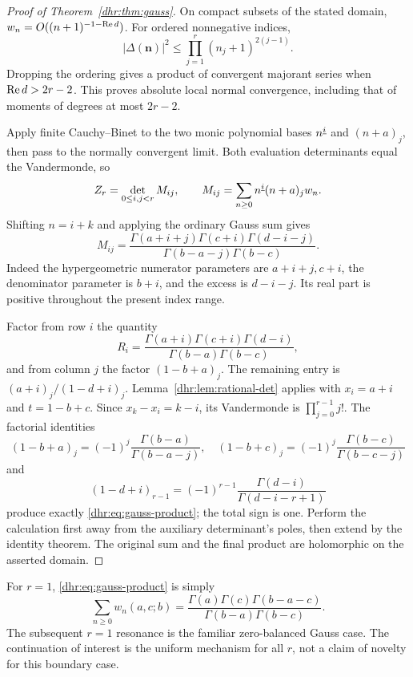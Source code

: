 \begin{proof}[Proof of Theorem~\ref{dhr:thm:gauss}]
On compact subsets of the stated domain,
$w_n=O((n+1)^{-1-\operatorname{Re} d})$. For ordered nonnegative indices,
\[
 |\Delta(\bm n)|^2\leq\prod_{j=1}^r(n_j+1)^{2(j-1)}.
\]
Dropping the ordering gives a product of convergent majorant series
when $\operatorname{Re} d>2r-2$. This proves absolute local normal convergence,
including that of moments of degrees at most $2r-2$.

Apply finite Cauchy--Binet to the two monic polynomial bases
$n^{\underline{i}}$ and $(n+a)_j$, then pass to the normally convergent
limit. Both evaluation determinants equal the Vandermonde, so
\begin{equation}\label{dhr:eq:moment-det}
 Z_r=\det_{0\leq i,j<r}M_{ij},\qquad
 M_{ij}=\sum_{n\geq0}n^{\underline{i}}(n+a)_j w_n.
\end{equation}
Shifting $n=i+k$ and applying the ordinary Gauss sum gives
\begin{equation}\label{dhr:eq:mixed-moment}
 M_{ij}=\frac{\Gamma(a+i+j)\Gamma(c+i)\Gamma(d-i-j)}
 {\Gamma(b-a-j)\Gamma(b-c)}.
\end{equation}
Indeed the hypergeometric numerator parameters are $a+i+j,c+i$,
the denominator parameter is $b+i$, and the excess is $d-i-j$.
Its real part is positive throughout the present index range.

Factor from row $i$ the quantity
\[
 R_i=\frac{\Gamma(a+i)\Gamma(c+i)\Gamma(d-i)}
 {\Gamma(b-a)\Gamma(b-c)},
\]
and from column $j$ the factor $(1-b+a)_j$. The remaining entry is
$(a+i)_j/(1-d+i)_j$. Lemma~\ref{dhr:lem:rational-det} applies with
$x_i=a+i$ and $t=1-b+c$. Since $x_k-x_i=k-i$, its Vandermonde
is $\prod_{j=0}^{r-1}j!$. The factorial identities
\[
 (1-b+a)_j=(-1)^j\frac{\Gamma(b-a)}{\Gamma(b-a-j)},\quad
 (1-b+c)_j=(-1)^j\frac{\Gamma(b-c)}{\Gamma(b-c-j)}
\]
and
\[
 (1-d+i)_{r-1}=(-1)^{r-1}
       \frac{\Gamma(d-i)}{\Gamma(d-i-r+1)}
\]
produce exactly \eqref{dhr:eq:gauss-product}; the total sign is one.
Perform the calculation first away from the auxiliary determinant's
poles, then extend by the identity theorem. The original sum and the
final product are holomorphic on the asserted domain.
\end{proof}

\begin{remark}
For $r=1$, \eqref{dhr:eq:gauss-product} is simply
\[
 \sum_{n\geq0}w_n(a,c;b)
 =\frac{\Gamma(a)\Gamma(c)\Gamma(b-a-c)}
 {\Gamma(b-a)\Gamma(b-c)}.
\]
The subsequent $r=1$ resonance is the familiar zero-balanced Gauss
case. The continuation of interest is the uniform mechanism for all $r$,
not a claim of novelty for this boundary case.
\end{remark}
